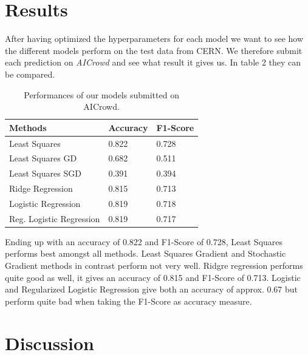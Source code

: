 \documentclass[10pt,conference,compsocconf]{IEEEtran}
\begin{document}
\newpage

\section{Results}


After having optimized the hyperparameters for each model we want to see how the different models perform on the test data from CERN. We therefore submit each prediction on \textit{AICrowd} and see what result it gives us. In table 2 they can be compared.


\begin{table}[h]
	\centering
	\begin{tabular}[c]{|l||l|l|}
		\hline
		Methods&Accuracy&F1-Score\\
	\hline
	Least Squares&0.822&0.728\\
	Least Squares GD&0.682&0.511\\
	Least Squares SGD&0.391&0.394\\		
	Ridge Regression&0.815&0.713\\
	Logistic Regression&0.819&0.718\\
	Reg. Logistic Regression&0.819&0.717\\
	\hline
	\end{tabular}
	\caption{Performances of our models submitted on AICrowd.}
	\label{tab:perform}
\end{table}

Ending up with an accuracy of 0.822 and F1-Score of 0.728, Least Squares performs best amongst all methods. Least Squares Gradient and Stochastic Gradient methods in contrast perform not very well. 
Ridgre regression performs quite good as well, it gives an accuracy of 0.815 and F1-Score of 0.713.
Logistic and Regularized Logistic Regression give both an accuracy of approx. 0.67 but perform quite bad when taking the F1-Score as accuracy measure. 


\section{Discussion}
\end{document}
